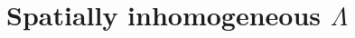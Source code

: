 \documentclass[final,3p,times,twocolumn]{elsarticle}
\newcommand{\inline}[1]{\texttt{#1}\xspace}
\newcommand{\um}{\mu\mathrm{m}}
\begin{document}

\section{Spatially inhomogeneous $\Lambda$}
\label{appendix:inhomogeneous}
\end{document}
